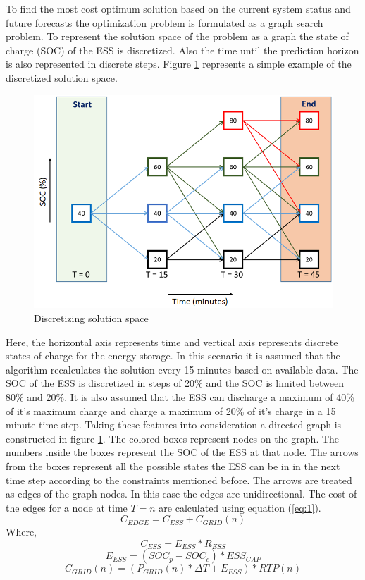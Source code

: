  To find the most cost optimum solution based on the current system status and future forecasts the optimization problem is formulated as a graph search problem. To represent the solution space of the problem as a graph the state of charge (SOC) of the ESS is discretized. Also the time until the prediction horizon is also represented in discrete steps. Figure \ref{fig:F1_Dis} represents a simple example of the discretized solution space.

\begin{figure}[!ht]
    \centering
    \includegraphics[width = \linewidth]{figs/F1_1_Dis.png}
    \caption{Discretizing solution space}
    \label{fig:F1_Dis}
\end{figure}
Here, the horizontal axis represents time and vertical axis represents discrete states of charge for the energy storage. In this scenario it is assumed that the algorithm recalculates the solution every 15 minutes based on available data. The SOC of the ESS is discretized in steps of 20\% and the SOC is limited between 80\% and 20\%. It is also assumed that the ESS can discharge a maximum of 40\% of it's maximum charge and charge a maximum of 20\% of it's charge in a 15 minute time step. Taking these features into consideration a directed graph is constructed in figure \ref{fig:F1_Dis}. The colored boxes represent nodes on the graph. The numbers inside the boxes represent the SOC of the ESS at that node. The arrows from the boxes represent all the possible states the ESS can be in in the next time step according to the constraints mentioned before. The arrows are treated as edges of the graph nodes. In this case the edges are unidirectional. The cost of the edges for a node at time $T = n$ are calculated using equation (\ref{eq:1}).
\begin{equation}
\label{eq:1}
    C_{EDGE} = C_{ESS}+C_{GRID}(n)
\end{equation}
Where,
$$
C_{ESS} = E_{ESS}*R_{ESS} 
$$
$$
E_{ESS} = (SOC_p - SOC_c)*ESS_{CAP}
$$
$$
C_{GRID}(n) = (P_{GRID}(n)*\Delta T + E_{ESS})*RTP(n)
$$

